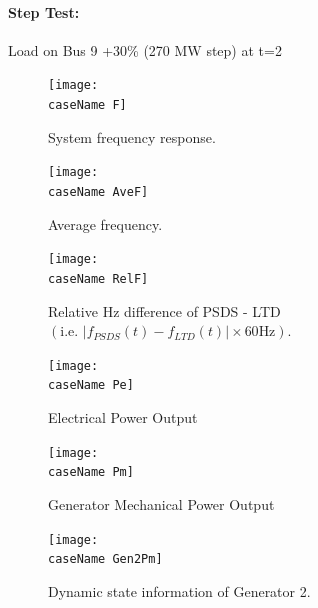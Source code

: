 \documentclass[12pt]{article}
\begin{document}
\paragraph{Step Test:} Load on Bus 9 +30\% (270 MW step) at t=2
	\begin{figure}[h!]
			\centering
			\texttt{[image: \\caseName F]}\vspace{-.5em}
			\caption{System frequency response.}
			\label{\caseName F}		 
	\end{figure}%
	\begin{figure}[h!]
			\centering
			\texttt{[image: \\caseName AveF]}\vspace{-.5em}
			\caption{Average frequency.}
			\label{\caseName AveF}		 
	\end{figure}%

	\begin{figure}[h!]
			\centering
			\texttt{[image: \\caseName RelF]}\vspace{-.5em}
			\caption{Relative Hz difference of PSDS - LTD $\left( \text{i.e. }  \left|f_{PSDS}(t)- f_{LTD}(t)\right| \times 60 \text{Hz} \right)$.}
			\label{\caseName RelF}		 
	\end{figure}%
%
\pagebreak
	\begin{figure}[h!]
			\centering
			\texttt{[image: \\caseName Pe]}\vspace{-.5em}
			\caption{Electrical Power Output}
			\label{\caseName Pe}		 
	\end{figure}%
	\begin{figure}[h!]
			\centering
			\texttt{[image: \\caseName Pm]}\vspace{-.5em}
			\caption{Generator Mechanical Power Output}
			\label{\caseName Pm}		 
	\end{figure}%
	\begin{figure}[h!]
			\centering
			\texttt{[image: \\caseName Gen2Pm]}\vspace{-.5em}
			\caption{Dynamic state information of Generator 2.}
			\label{\caseName V}		 
	\end{figure}%
\end{document}
